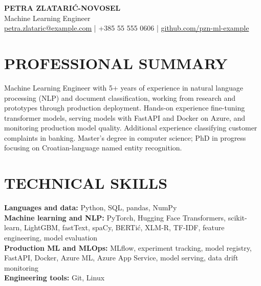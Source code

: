 \documentclass[10pt,a4paper]{article}
\newcommand{\cvsection}[1]{\section*{#1}}
\begin{document}
{\LARGE\bfseries\color{primarycolor} PETRA ZLATARIĆ-NOVOSEL}\\[0.3em]
{\large\color{accentcolor} Machine Learning Engineer}\\[0.3em]
\href{mailto:petra.zlataric@example.com}{petra.zlataric@example.com} | +385 55 555 0606 | \href{https://github.com/pzn-ml-example}{github.com/pzn-ml-example}

\cvsection{PROFESSIONAL SUMMARY}
Machine Learning Engineer with 5+ years of experience in natural language processing (NLP) and document classification, working from research and prototypes through production deployment. Hands-on experience fine-tuning transformer models, serving models with FastAPI and Docker on Azure, and monitoring production model quality. Additional experience classifying customer complaints in banking. Master's degree in computer science; PhD in progress focusing on Croatian-language named entity recognition.

\cvsection{TECHNICAL SKILLS}
\textbf{Languages and data:} Python, SQL, pandas, NumPy\\
\textbf{Machine learning and NLP:} PyTorch, Hugging Face Transformers, scikit-learn, LightGBM, fastText, spaCy, BERTić, XLM-R, TF-IDF, feature engineering, model evaluation\\
\textbf{Production ML and MLOps:} MLflow, experiment tracking, model registry, FastAPI, Docker, Azure ML, Azure App Service, model serving, data drift monitoring\\
\textbf{Engineering tools:} Git, Linux
\end{document}
